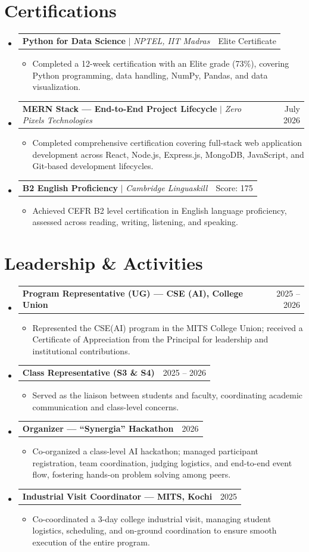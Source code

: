 \documentclass[a4paper,10pt]{article}
\makeatletter
\newcommand{\resumeItem}[1]{
  \item\small{
    {#1 \vspace{-2pt}}
  }
}
\newcommand{\resumeProjectHeading}[2]{
    \item
    \begin{tabular*}{0.97\textwidth}{l@{\extracolsep{\fill}}r}
      \small#1 & #2 \\
    \end{tabular*}\vspace{-7pt}
}
\newcommand{\resumeSubHeadingListStart}{\begin{itemize}[leftmargin=0.15in, label={}]}
\newcommand{\resumeSubHeadingListEnd}{\end{itemize}}
\newcommand{\resumeItemListStart}{\begin{itemize}}
\newcommand{\resumeItemListEnd}{\end{itemize}\vspace{-5pt}}
\makeatother
\begin{document}
\section{Certifications}
  \resumeSubHeadingListStart
    \resumeProjectHeading{\textbf{Python for Data Science} $|$ \emph{NPTEL, IIT Madras}}{Elite Certificate}
    \resumeItemListStart
      \resumeItem{Completed a 12-week certification with an Elite grade (73\%), covering Python programming, data handling, NumPy, Pandas, and data visualization.}
    \resumeItemListEnd
    \resumeProjectHeading{\textbf{MERN Stack --- End-to-End Project Lifecycle} $|$ \emph{Zero Pixels Technologies}}{July 2026}
    \resumeItemListStart
      \resumeItem{Completed comprehensive certification covering full-stack web application development across React, Node.js, Express.js, MongoDB, JavaScript, and Git-based development lifecycles.}
    \resumeItemListEnd
    \resumeProjectHeading{\textbf{B2 English Proficiency} $|$ \emph{Cambridge Linguaskill}}{Score: 175}
    \resumeItemListStart
      \resumeItem{Achieved CEFR B2 level certification in English language proficiency, assessed across reading, writing, listening, and speaking.}
    \resumeItemListEnd
  \resumeSubHeadingListEnd


\section{Leadership \& Activities}
  \resumeSubHeadingListStart
    \resumeProjectHeading{\textbf{Program Representative (UG) --- CSE (AI), College Union}}{2025 -- 2026}
    \resumeItemListStart
      \resumeItem{Represented the CSE(AI) program in the MITS College Union; received a Certificate of Appreciation from the Principal for leadership and institutional contributions.}
    \resumeItemListEnd
    \resumeProjectHeading{\textbf{Class Representative (S3 \& S4)}}{2025 -- 2026}
    \resumeItemListStart
      \resumeItem{Served as the liaison between students and faculty, coordinating academic communication and class-level concerns.}
    \resumeItemListEnd
    \resumeProjectHeading{\textbf{Organizer --- ``Synergia'' Hackathon}}{2026}
    \resumeItemListStart
      \resumeItem{Co-organized a class-level AI hackathon; managed participant registration, team coordination, judging logistics, and end-to-end event flow, fostering hands-on problem solving among peers.}
    \resumeItemListEnd
    \resumeProjectHeading{\textbf{Industrial Visit Coordinator --- MITS, Kochi}}{2025}
    \resumeItemListStart
      \resumeItem{Co-coordinated a 3-day college industrial visit, managing student logistics, scheduling, and on-ground coordination to ensure smooth execution of the entire program.}
    \resumeItemListEnd
  \resumeSubHeadingListEnd
\end{document}
